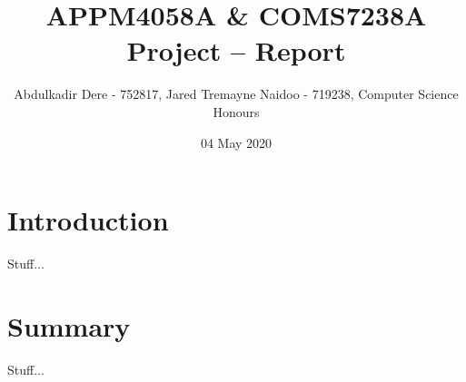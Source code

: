 

\title{APPM4058A \& COMS7238A Project -- Report}
\author{Abdulkadir Dere - 752817, Jared Tremayne Naidoo - 719238, Computer Science Honours}
\date{04 May 2020} 
\maketitle 
\pagestyle{fancy}
\fancyhf{}
\fancyhead[R]{\thepage}
{} 

\section{Introduction}
Stuff...

\section{Summary}
Stuff...



 
